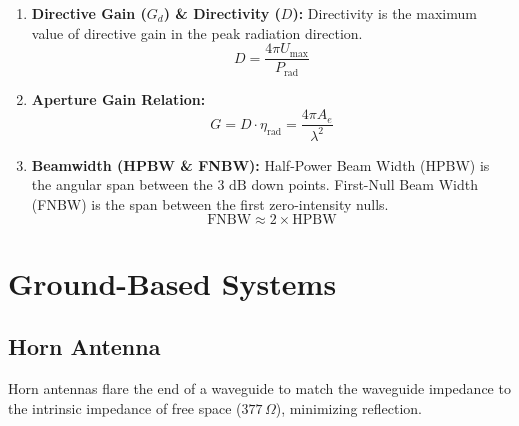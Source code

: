 \documentclass[12pt,a4paper]{article}
\begin{document}
\begin{tcolorbox}[formulabox, title={\textbf{Core Antenna Parameters}}]
\begin{enumerate}[label=\textbf{\arabic*.}, leftmargin=1.5em, itemsep=4pt, topsep=2pt]
  \item \textbf{Directive Gain ($G_d$) \& Directivity ($D$):} Directivity is the maximum value of directive gain in the peak radiation direction.
    \begin{equation}
      D = \frac{4\pi U_{\text{max}}}{P_{\text{rad}}}
    \end{equation}
  \item \textbf{Aperture Gain Relation:}
    \begin{equation}
      G = D \cdot \eta_{\text{rad}} = \frac{4\pi A_e}{\lambda^2}
    \end{equation}
  \item \textbf{Beamwidth (HPBW \& FNBW):} Half-Power Beam Width (HPBW) is the angular span between the $3\text{ dB}$ down points. First-Null Beam Width (FNBW) is the span between the first zero-intensity nulls.
    \begin{equation}
      \text{FNBW} \approx 2 \times \text{HPBW}
    \end{equation}
\end{enumerate}
\end{tcolorbox}

\section{Ground-Based Systems}

\subsection{Horn Antenna}
Horn antennas flare the end of a waveguide to match the waveguide impedance to the intrinsic impedance of free space ($377\,\Omega$), minimizing reflection.

\begin{tcolorbox}[tikzbox, title={Horn Antenna Types}]
\centering
{}
\end{tcolorbox}
\end{document}
